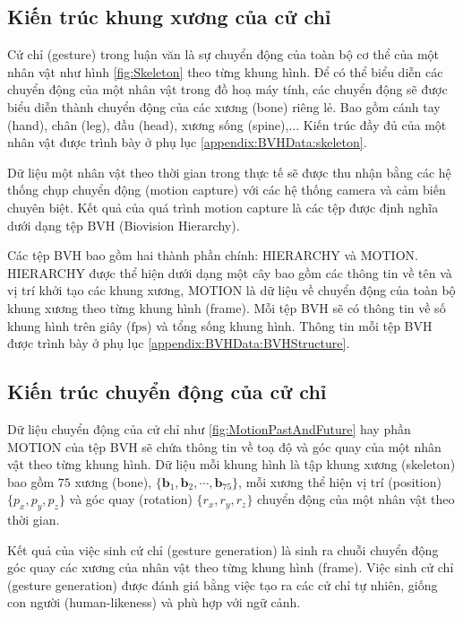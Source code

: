 \subsection{Kiến trúc khung xương của cử chỉ}

Cử chỉ (gesture) trong luận văn là sự chuyển động của toàn bộ cơ thể của một nhân vật như hình \autoref{fig:Skeleton} theo từng khung hình. Để có thể biểu diễn các chuyển động của một nhân vật trong đồ hoạ máy tính, các chuyển động sẽ được biểu diễn thành chuyển động của các xương (bone) riêng lẻ. Bao gồm cánh tay (hand), chân (leg), đầu (head), xương sống (spine),... Kiến trúc đầy đủ của một nhân vật được trình bày ở phụ lục \autoref{appendix:BVHData:skeleton}.

Dữ liệu một nhân vật theo thời gian trong thực tế sẽ được thu nhận bằng các hệ thống chụp chuyển động (motion capture) với các hệ thống camera và cảm biến chuyên biệt. Kết quả của quá trình motion capture là các tệp được định nghĩa dưới dạng tệp BVH (Biovision Hierarchy).

Các tệp BVH bao gồm hai thành phần chính: {HIERARCHY} và {MOTION}. HIERARCHY được thể hiện dưới dạng một cây bao gồm các thông tin về tên và vị trí khởi tạo các khung xương, MOTION là dữ liệu về chuyển động của toàn bộ khung xương theo từng khung hình (frame).  Mỗi tệp BVH sẽ có thông tin về số khung hình trên giây ($\text{fps}$) và tổng sống khung hình. Thông tin mỗi tệp BVH được trình bày ở phụ lục \autoref{appendix:BVHData:BVHStructure}. 


\subsection{Kiến trúc chuyển động của cử chỉ}

Dữ liệu chuyển động của cử chỉ như \autoref{fig:MotionPastAndFuture} hay phần MOTION của tệp BVH sẽ chứa thông tin về toạ độ và góc quay của một nhân vật theo từng khung hình. Dữ liệu mỗi khung hình là tập khung xương (skeleton) bao gồm $75$ xương (bone), $\{ \textbf{b}_{1}, \textbf{b}_{2}, \cdots , \textbf{b}_{75} \}$, mỗi xương thể hiện vị trí (position) $\{ p_{x}, p_{y}, p_{z} \}$ và góc quay (rotation) $\{ r_{x}, r_{y}, r_{z} \}$ chuyển động của một nhân vật theo thời gian.

Kết quả của việc sinh cử chỉ (gesture generation) là sinh ra chuỗi chuyển động góc quay các xương của nhân vật theo từng khung hình (frame). Việc sinh cử chỉ (gesture generation) được đánh giá bằng việc tạo ra các cử chỉ tự nhiên, giống con người (human-likeness) và phù hợp với ngữ cảnh.

